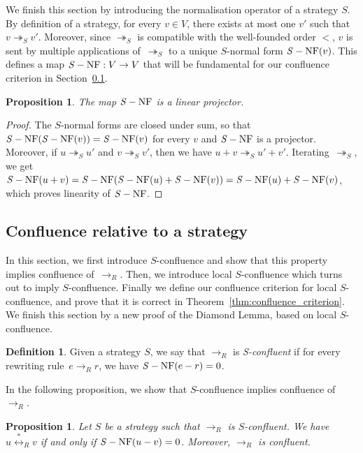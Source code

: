 \documentclass[10pt]{easychair}
\newtheorem{proposition}[theorem]{Proposition}
\theoremstyle{definition}
\newtheorem{definition}[theorem]{Definition}
\newcommand\rewR{\to_R}
\newcommand\rewS{\twoheadrightarrow_S}
\newcommand\equivR{\overset{*}{\leftrightarrow}_R}
\DeclareMathOperator{\SNF}{{\it S}-NF}
\begin{document}
We finish this section by introducing the normalisation operator of a
strategy $S$. By definition of a strategy, for every $v\in V$, there
exists at most one $v'$ such that $v\rewS v'$. Moreover, since $\rewS$ is
compatible with the well-founded order $<$, $v$ is sent by multiple
applications of~$\rewS$ to a unique $S$-normal form $\SNF(v)$. This
defines a map $\SNF:V\to V$ that will be fundamental for our confluence
criterion in Section~\ref{sec:confluence_relative_to_a_strategy}.
\medskip

\begin{proposition}\label{prop:linearity_of_H}
  The map $\SNF$ is a linear projector.
\end{proposition}

\begin{proof}
  The $S$-normal forms are closed under sum, so that
  $\SNF(\SNF(v))=\SNF(v)$ for every $v$ and $\SNF$ is a projector.
  Moreover, if $u\rewS u'$ and $v\rewS v'$, then we have
  $u+v\rewS u'+v'$. Iterating~$\rewS$, we get
  $\SNF(u+v)=\SNF(\SNF(u)+\SNF(v))=\SNF(u)+\SNF(v)$, which proves
  linearity of $\SNF$.
\end{proof}

\subsection{Confluence relative to a strategy}
\label{sec:confluence_relative_to_a_strategy}

In this section, we first introduce $S$-confluence and show that this
property implies confluence of~$\rewR$. Then, we introduce local
$S$-confluence which turns out to imply $S$-confluence. Finally we define
our confluence criterion for local $S$-confluence, and prove that it is
correct in Theorem~\ref{thm:confluence_criterion}. We finish this section
by a new proof of the Diamond Lemma, based on local $S$-confluence.
\smallskip

\begin{definition}\label{def:standardisation_property}
  Given a strategy $S$, we say that $\rewR$ is \emph{S-confluent} if for
  every rewriting rule~$e\rewR r$, we have $\SNF(e-r)=0$.
\end{definition}
\smallskip

In the following proposition, we show that $S$-confluence implies
confluence of $\rewR$.
\medskip

\begin{proposition}\label{prop:h_and_R_confluence}
  Let $S$ be a strategy such that $\rewR$ is $S$-confluent. We have 
  $u\equivR v$ if and only if $\SNF(u-v)=0$. Moreover, $\rewR$ is
  confluent.
\end{proposition}
\end{document}
